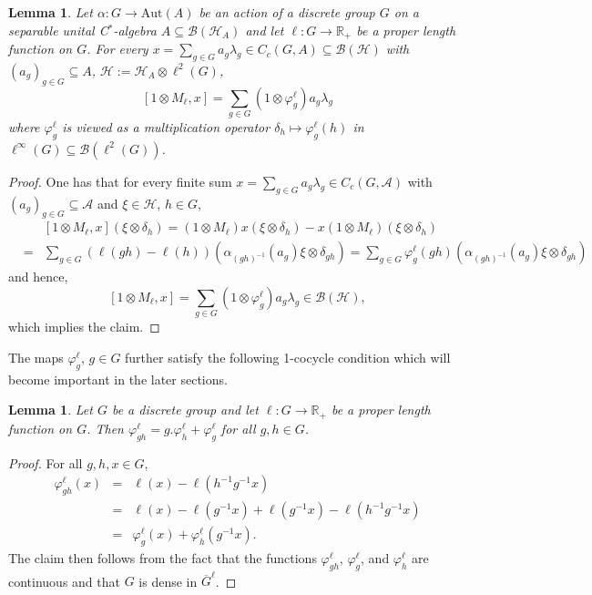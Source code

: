 \documentclass[a4paper,11pt,reqno]{amsart}
\numberwithin{equation}{section}
\numberwithin{equation}{section}
\newtheorem{lemma}[theorem]{Lemma}
\theoremstyle{definition}
\theoremstyle{remark}
\theoremstyle{remark}
\begin{document}
\begin{lemma} \label{Commutator identity} Let $\alpha:G\rightarrow\text{Aut}(A)$
be an action of a discrete group $G$ on a separable unital C$^{\ast}$-algebra
$A\subseteq\mathcal{B}(\mathcal{H}_{A})$ and let $\ell:G\rightarrow\mathbb{R}_{+}$
be a proper length function on $G$. For every $x=\sum_{g\in G}a_{g}\lambda_{g}\in C_{c}(G,A)\subseteq\mathcal{B}(\mathcal{H})$
with $(a_{g})_{g\in G}\subseteq A$, $\mathcal{H}:=\mathcal{H}_{A}\otimes\ell^{2}(G)$,
\[
[1\otimes M_{\ell},x]=\sum_{g\in G}(1\otimes\varphi_{g}^{\ell})a_{g}\lambda_{g}
\]
where $\varphi_{g}^{\ell}$ is viewed as a multiplication operator
$\delta_{h}\mapsto\varphi_{g}^{\ell}(h)$ in $\ell^{\infty}(G)\subseteq\mathcal{B}(\ell^{2}(G))$.
\end{lemma}

\begin{proof} One has that for every finite sum $x=\sum_{g\in G}a_{g}\lambda_{g}\in C_{c}(G,\mathcal{A})$
with $(a_{g})_{g\in G}\subseteq\mathcal{A}$ and $\xi\in\mathcal{H}$,
$h\in G$, 
\begin{eqnarray*}
 &  & [1\otimes M_{\ell},x](\xi\otimes\delta_{h})=(1\otimes M_{\ell})x(\xi\otimes\delta_{h})-x(1\otimes M_{\ell})(\xi\otimes\delta_{h})\\
 & = & \sum_{g\in G}\left(\ell(gh)-\ell(h)\right)(\alpha_{(gh)^{-1}}(a_{g})\xi\otimes\delta_{gh})=\sum_{g\in G}\varphi_{g}^{\ell}(gh)(\alpha_{(gh)^{-1}}(a_{g})\xi\otimes\delta_{gh})
\end{eqnarray*}
and hence, 
\[
[1\otimes M_{\ell},x]=\sum_{g\in G}(1\otimes\varphi_{g}^{\ell})a_{g}\lambda_{g}\in\mathcal{B}(\mathcal{H}),
\]
which implies the claim. \end{proof}

The maps $\varphi_{g}^{\ell}$, $g\in G$ further satisfy the following
1-cocycle condition which will become important in the later sections.

\begin{lemma} \label{1-cocycle} Let $G$ be a discrete group and
let $\ell:G\rightarrow\mathbb{R}_{+}$ be a proper length function
on $G$. Then $\varphi_{gh}^{\ell}=g.\varphi_{h}^{\ell}+\varphi_{g}^{\ell}$
for all $g,h\in G$. \end{lemma}

\begin{proof} For all $g,h,x\in G$, 
\begin{eqnarray*}
\varphi_{gh}^{\ell}(x) & = & \ell(x)-\ell(h^{-1}g^{-1}x)\\
 & = & \ell(x)-\ell(g^{-1}x)+\ell(g^{-1}x)-\ell(h^{-1}g^{-1}x)\\
 & = & \varphi_{g}^{\ell}(x)+\varphi_{h}^{\ell}(g^{-1}x).
\end{eqnarray*}
The claim then follows from the fact that the functions $\varphi_{gh}^{\ell}$,
$\varphi_{g}^{\ell}$, and $\varphi_{h}^{\ell}$ are continuous and
that $G$ is dense in $\overline{G}^{\ell}$. \end{proof}
\end{document}
